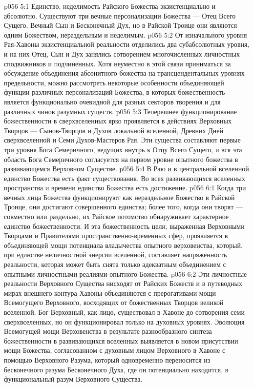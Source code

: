 \vs p056 5:1 Единство, неделимость Райского Божества экзистенциально и абсолютно. Существуют три вечные персонализации Божества --- Отец Всего Сущего, Вечный Сын и Бесконечный Дух, но в Райской Троице они  являются одним Божеством, нераздельным и неделимым.
\vs p056 5:2 \pc От изначального уровня Рая\hyp{}Хавоны экзистенциальной реальности отделились два субабсолютных уровня, и на них Отец, Сын и Дух занялись сотворением многочисленных личностных сподвижников и подчиненных. Хотя неуместно в этой связи приниматься за обсуждение объединения абсонитного божества на трансцендентальных уровнях предельности, можно рассмотреть некоторые особенности объединяющей функции различных персонализаций Божества, в которых божественность является функционально очевидной для разных секторов творения и для различных чинов разумных существ.
\vs p056 5:3 Теперешнее функционирование божественности в сверхвселенных ярко проявляется в действиях Верховных Творцов --- Сынов\hyp{}Творцов и Духов локальной вселенной, Древних Дней сверхвселенной и Семи Духов\hyp{}Мастеров Рая. Эти существа составляют первые три уровня Бога Семеричного, ведущих внутрь к Отцу Всего Сущего, и вся эта область Бога Семеричного согласуется на первом уровне опытного божества в развивающемся Верховном Существе.
\vs p056 5:4 \pc В Раю и в центральной вселенной единство Божества есть факт существования. Во всех развивающихся вселенных пространства и времени единство Божества есть достижение.
\vs p056 6:1 Когда три вечных лица Божества функционируют как нераздельное Божество в Райской Троице, они достигают совершенного единства; более того, когда они творят --- совместно или раздельно, их Райское потомство обнаруживает характерное единство божественности. И эта божественность цели, выраженная Верховными Творцами и Правителями пространственно\hyp{}временных сфер, проявляется в объединяющей мощи потенциала владычества опытного верховенства, который, при единстве неличностной энергии вселенной, составляет напряженность реальности, которая может быть снята только адекватным объединением с опытными личностными реалиями опытного Божества.
\vs p056 6:2 Эти личностные реальности Верховного Существа нисходят от Райских Божеств и в путеводных мирах внешнего контура Хавоны объединяются с прерогативами мощи Всемогущего Верховного, восходящих от божественных Творцов великой вселенной. Бог Верховный, как лицо, существовал в Хавоне до сотворения семи сверхвселенных, но он функционировал только на духовных уровнях. Эволюция Всемогущей мощи Верховенства в результате разнообразного синтеза божественности в развивающихся вселенных выявляется в новом присутствии мощи Божества, согласованном с духовным лицом Верховного в Хавоне с помощью Верховного Разума, который одновременно переносится из бесконечного разума Бесконечного Духа, где он потенциально находится, в функциональный разум Верховного Существа.
